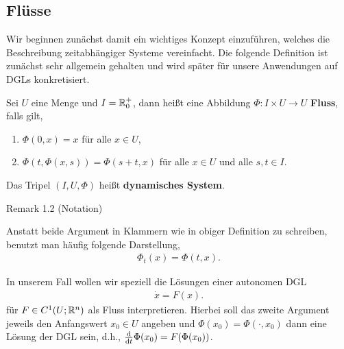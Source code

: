 \subsection{Flüsse}
\label{\detokenize{ode/fluesse:flusse}}
Wir beginnen zunächst damit ein wichtiges Konzept einzuführen, welches die Beschreibung zeitabhängiger Systeme vereinfacht. Die folgende Definition ist zunächst sehr allgemein gehalten und wird später für unsere Anwendungen auf DGLs konkretisiert.
\label{ode/fluesse:def:Fluss}
\begin{definition}{}{}



Sei \(U\) eine Menge und \(I=\mathbb{R}^+_0\), dann heißt eine Abbildung \(\Phi:I\times U\rightarrow U\) \textbf{Fluss}, falls gilt,
\begin{enumerate}

\item {} 
\(\Phi(0, x) = x\) für alle \(x\in U\),

\item {} 
\(\Phi(t, \Phi(x,s)) = \Phi(s + t, x)\) für alle \(x\in U\) und alle \(s,t\in I\).

\end{enumerate}

Das Tripel \((I, U, \Phi)\) heißt \textbf{dynamisches System}.
\end{definition}
\label{ode/fluesse:remark-1}
\begin{emphBox}{}{}{Remark 1.2 (Notation)}



Anstatt beide Argument in Klammern wie in obiger Definition zu schreiben, benutzt man häufig folgende Darstellung,
\begin{align*}
\Phi_t(x) = \Phi(t, x).
\end{align*}\end{emphBox}

In unserem Fall wollen wir speziell die Lösungen einer autonomen DGL
\begin{align*}
\dot{x} = F(x).
\end{align*}
für \(F\in C^1(U;\mathbb{R}^n)\) als Fluss interpretieren. Hierbei soll das zweite Argument jeweils den Anfangswert
\(x_0\in U\) angeben und \(\Phi(x_0) = \Phi(\cdot, x_0)\) dann eine Lösung der DGL sein, d.h., \(\frac{\mathrm{d}}{\mathrm{d} t} \Phi(x_0) = F(\Phi(x_0))\).

